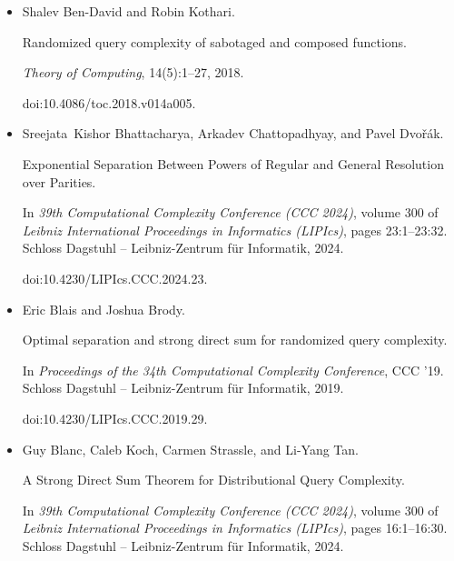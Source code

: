 \begin{itemize}
doi:10.4230/LIPIcs.APPROX/RANDOM.2020.28.





\item[] 
[10]

Shalev Ben-David and Robin Kothari.


Randomized query complexity of sabotaged and composed functions.


\emph{Theory of Computing}, 14(5):1–27, 2018.


doi:10.4086/toc.2018.v014a005.





\item[] 
[11]

Sreejata Kishor Bhattacharya, Arkadev Chattopadhyay, and Pavel Dvořák.


Exponential Separation Between Powers of Regular and General
Resolution over Parities.


In \emph{39th Computational Complexity Conference (CCC 2024)}, volume
300 of \emph{Leibniz International Proceedings in Informatics (LIPIcs)}, pages
23:1–23:32. Schloss Dagstuhl – Leibniz-Zentrum für Informatik, 2024.


doi:10.4230/LIPIcs.CCC.2024.23.





\item[] 
[12]

Eric Blais and Joshua Brody.


Optimal separation and strong direct sum for randomized query
complexity.


In \emph{Proceedings of the 34th Computational Complexity Conference},
CCC ’19. Schloss Dagstuhl – Leibniz-Zentrum für Informatik, 2019.


doi:10.4230/LIPIcs.CCC.2019.29.





\item[] 
[13]

Guy Blanc, Caleb Koch, Carmen Strassle, and Li-Yang Tan.


A Strong Direct Sum Theorem for Distributional Query Complexity.


In \emph{39th Computational Complexity Conference (CCC 2024)}, volume
300 of \emph{Leibniz International Proceedings in Informatics (LIPIcs)}, pages
16:1–16:30. Schloss Dagstuhl – Leibniz-Zentrum für Informatik, 2024.



\end{itemize}
